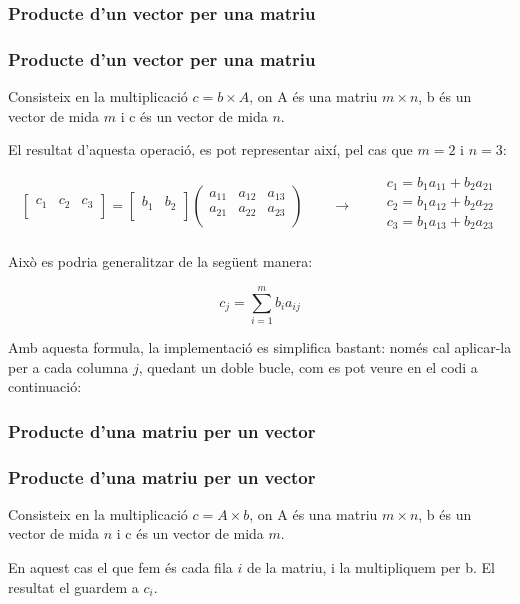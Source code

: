 \documentclass[8pt]{beamer}
\begin{document}
\subsubsection[Vector-matriu]{Producte d'un vector per una matriu}
\begin{frame}
  \frametitle{Producte d'un vector per una matriu}  
  Consisteix en la multiplicació $c = b \times A$, on A és una matriu $m \times n$, b és un vector de mida $m$ i c és un vector de mida $n$.

El resultat d'aquesta operació, es pot representar així, pel cas que $m = 2$ i $n = 3$:

 \[
 	\begin{bmatrix}
		  	c_1	&	c_2	& c_3	\\
\end{bmatrix} = 
 	\begin{bmatrix}
		  	b_1	&	b_2	\\
\end{bmatrix}
 	\begin{pmatrix}
		  	a_{11}	&	a_{12} & a_{13}\\
		  	a_{21}	&	a_{22} & a_{23}\\
\end{pmatrix}
\qquad \longrightarrow \qquad
 \begin{matrix} 
 c_1 = b_1 a_{11} + b_2 a_{21} \\
 c_2 = b_1 a_{12} + b_2 a_{22} \\
 c_3 = b_1 a_{13} + b_2 a_{23} \\
 \end{matrix}
 \]

Això es podria generalitzar de la següent manera:

\[
 c_j = \sum_{i=1}^{m} b_i a_{ij}
\]

Amb aquesta formula, la implementació es simplifica bastant: només cal aplicar-la per a cada columna $j$, quedant un doble bucle, com es pot veure en el codi a continuació:

\end{frame}

\begin{frame}
  
\end{frame}
\subsubsection[Matriu-vector]{Producte d'una matriu per un vector}
\begin{frame}
\frametitle{Producte d'una matriu per un vector}
Consisteix en la multiplicació $c = A \times b$, on A és una matriu $m \times n$, b és un vector de mida $n$ i c és un vector de mida $m$.

En aquest cas el que fem és cada fila $i$ de la matriu, i la multipliquem per b. El resultat el guardem a $c_i$.
\end{frame}
\end{document}
